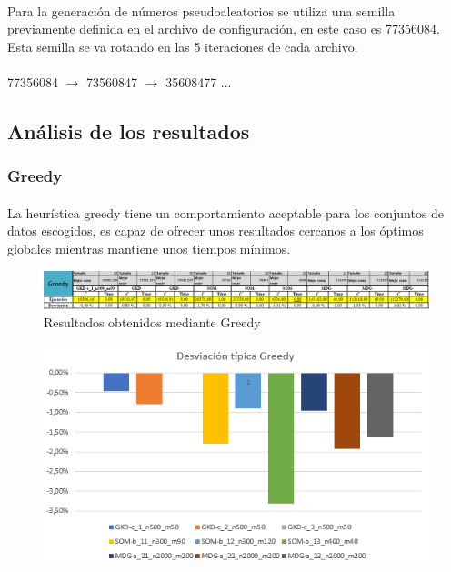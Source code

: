 \documentclass{article}
\begin{document}
	\paragraph{}Para la generación de números pseudoaleatorios se utiliza una semilla previamente definida en el archivo de configuración, en este caso es 77356084. Esta semilla se va rotando en las 5 iteraciones de cada archivo.
	
	
	\paragraph{} 77356084 $\rightarrow$ 73560847 $\rightarrow$ 35608477  ...
	
	
	\subsection{Análisis de los resultados}
	
		\subsubsection{Greedy}
		
				\paragraph{}La heurística greedy tiene un comportamiento aceptable para los conjuntos de datos escogidos, es capaz de ofrecer unos resultados cercanos a los óptimos globales mientras mantiene unos tiempos mínimos.
			
			\begin{figure}[H]
				
				\centering
				\includegraphics[scale=0.4]{img/greegyResult}
				\caption{Resultados obtenidos mediante Greedy}
				
			\end{figure}
		
			\begin{figure}[H]
				
				\centering
				\includegraphics[scale=0.4]{img/DTGreedy}
				
			\end{figure}
		
\end{document}
